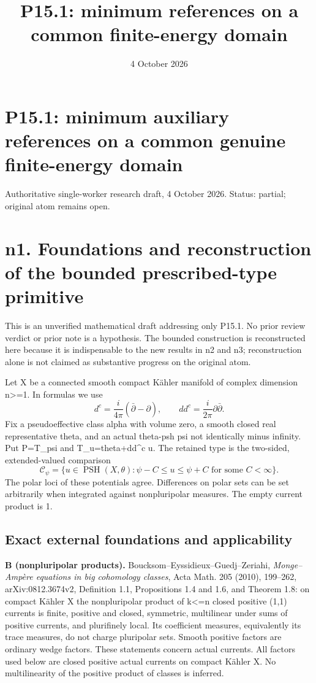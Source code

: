 \documentclass[
]{article}
\title{P15.1: minimum references on a common finite-energy domain}
\author{}
\date{4 October 2026}
\begin{document}
\maketitle

\section{P15.1: minimum auxiliary references on a common genuine
finite-energy
domain}\label{p15.1-minimum-auxiliary-references-on-a-common-genuine-finite-energy-domain}

Authoritative single-worker research draft, 4 October 2026. Status:
partial; original atom remains open.

\section{n1. Foundations and reconstruction of the bounded
prescribed-type
primitive}\label{n1.-foundations-and-reconstruction-of-the-bounded-prescribed-type-primitive}

This is an unverified mathematical draft addressing only P15.1. No prior
review verdict or prior note is a hypothesis. The bounded construction
is reconstructed here because it is indispensable to the new results in
n2 and n3; reconstruction alone is not claimed as substantive progress
on the original atom.

Let X be a connected smooth compact Kähler manifold of complex dimension
n\textgreater=1. In formulas we use \[
d^c=\frac{i}{4\pi}(\bar\partial-\partial),\qquad dd^c=\frac{i}{2\pi}\partial\bar\partial.
\] Fix a pseudoeffective class alpha with volume zero, a smooth closed
real representative theta, and an actual theta-psh psi not identically
minus infinity. Put P=T\_psi and T\_u=theta+dd\^{}c u. The retained type
is the two-sided, extended-valued comparison \[
\mathcal C_\psi=\{u\in\operatorname{PSH}(X,\theta):\psi-C\leq u\leq\psi+C
\text{ for some }C<\infty\}.
\] The polar loci of these potentials agree. Differences on polar sets
can be set arbitrarily when integrated against nonpluripolar measures.
The empty current product is 1.

\subsection{Exact external foundations and
applicability}\label{exact-external-foundations-and-applicability}

\textbf{B (nonpluripolar products).}
Boucksom--Eyssidieux--Guedj--Zeriahi, \emph{Monge--Ampère equations in
big cohomology classes}, Acta Math. 205 (2010), 199--262,
arXiv:0812.3674v2, Definition 1.1, Propositions 1.4 and 1.6, and Theorem
1.8: on compact Kähler X the nonpluripolar product of k\textless=n
closed positive (1,1) currents is finite, positive and closed,
symmetric, multilinear under sums of positive currents, and plurifinely
local. Its coefficient measures, equivalently its trace measures, do not
charge pluripolar sets. Smooth positive factors are ordinary wedge
factors. These statements concern actual currents. All factors used
below are closed positive actual currents on compact Kähler X. No
multilinearity of the positive product of classes is inferred.
\end{document}
